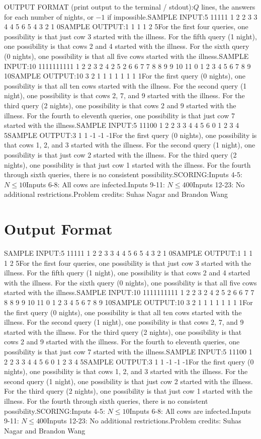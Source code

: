 \documentclass[12pt]{article}
\begin{document}
OUTPUT FORMAT (print output to the terminal / stdout):$Q$ lines, the answers for each number of nights, or $-1$ if impossible.SAMPLE INPUT:5
11111
1 2
2 3
3 4
4 5
6
5
4
3
2
1
0SAMPLE OUTPUT:1
1
1
1
2
5For the first four queries, one possibility is that just cow 3 started with the
illness. For the fifth query (1 night), one possibility is that cows 2 and 4
started with the illness. For the sixth query (0 nights), one possibility is
that all five cows started with the illness.SAMPLE INPUT:10
1111111111
1 2
2 3
2 4
2 5
2 6
6 7
7 8
8 9
9 10
11
0
1
2
3
4
5
6
7
8
9
10SAMPLE OUTPUT:10
3
2
1
1
1
1
1
1
1
1For the first query (0 nights), one possibility is that all ten cows started
with the illness. For the second query (1 night), one possibility is that cows
2, 7, and 9 started with the illness. For the third query (2 nights), one
possibility is that cows 2 and 9 started with the illness. For the fourth to
eleventh queries, one possibility is that just cow 7 started with the illness.SAMPLE INPUT:5
11100
1 2
2 3
3 4
4 5
6
0
1
2
3
4
5SAMPLE OUTPUT:3
1
1
-1
-1
-1For the first query (0 nights), one possibility is that cows 1, 2, and 3 started
with the illness. For the second query (1 night), one possibility is that just
cow 2 started with the illness. For the third query (2 nights), one possibility
is that just cow 1 started with the illness. For the fourth through sixth
queries, there is no consistent possibility.SCORING:Inputs 4-5: $N \le 10$Inputs 6-8: All cows are infected.Inputs 9-11: $N \le 400$Inputs 12-23: No additional restrictions.Problem credits: Suhas Nagar and Brandon Wang

\section*{Output Format}
SAMPLE INPUT:5
11111
1 2
2 3
3 4
4 5
6
5
4
3
2
1
0SAMPLE OUTPUT:1
1
1
1
2
5For the first four queries, one possibility is that just cow 3 started with the
illness. For the fifth query (1 night), one possibility is that cows 2 and 4
started with the illness. For the sixth query (0 nights), one possibility is
that all five cows started with the illness.SAMPLE INPUT:10
1111111111
1 2
2 3
2 4
2 5
2 6
6 7
7 8
8 9
9 10
11
0
1
2
3
4
5
6
7
8
9
10SAMPLE OUTPUT:10
3
2
1
1
1
1
1
1
1
1For the first query (0 nights), one possibility is that all ten cows started
with the illness. For the second query (1 night), one possibility is that cows
2, 7, and 9 started with the illness. For the third query (2 nights), one
possibility is that cows 2 and 9 started with the illness. For the fourth to
eleventh queries, one possibility is that just cow 7 started with the illness.SAMPLE INPUT:5
11100
1 2
2 3
3 4
4 5
6
0
1
2
3
4
5SAMPLE OUTPUT:3
1
1
-1
-1
-1For the first query (0 nights), one possibility is that cows 1, 2, and 3 started
with the illness. For the second query (1 night), one possibility is that just
cow 2 started with the illness. For the third query (2 nights), one possibility
is that just cow 1 started with the illness. For the fourth through sixth
queries, there is no consistent possibility.SCORING:Inputs 4-5: $N \le 10$Inputs 6-8: All cows are infected.Inputs 9-11: $N \le 400$Inputs 12-23: No additional restrictions.Problem credits: Suhas Nagar and Brandon Wang
\end{document}
